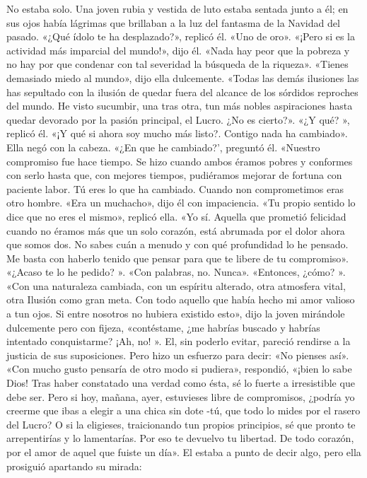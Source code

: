 \documentclass{novela}
\begin{document}
 No estaba solo. Una joven rubia y vestida de luto estaba sentada junto a él; en sus ojos había lágrimas que brillaban a la luz del fantasma de la Navidad del pasado.
 «¿Qué ídolo te ha desplazado?», replicó él.
 «Uno de oro».
 «¡Pero si es la actividad más imparcial del mundo!», dijo él. «Nada hay peor que la pobreza y no hay por que condenar con tal severidad la búsqueda de la riqueza».
 «Tienes demasiado miedo al mundo», dijo ella dulcemente. «Todas las demás ilusiones las has sepultado con la ilusión de quedar fuera del alcance de los sórdidos reproches del mundo. He visto sucumbir, una tras otra, tun más nobles aspiraciones hasta quedar devorado por la pasión principal, el Lucro. ¿No es cierto?».
 «¿Y qué? », replicó él. «¡Y qué si ahora soy mucho más listo?. Contigo nada ha cambiado».
 Ella negó con la cabeza.
 «¿En que he cambiado?', preguntó él.
 «Nuestro compromiso fue hace tiempo. Se hizo cuando ambos éramos pobres y conformes con serlo hasta que, con mejores tiempos, pudiéramos mejorar de fortuna con paciente labor. Tú eres lo que ha cambiado. Cuando non comprometimos eras otro hombre.
 «Era un muchacho», dijo él con impaciencia.
 «Tu propio sentido lo dice que no eres el mismo», replicó ella. «Yo sí. Aquella que prometió felicidad cuando no éramos más que un solo corazón, está abrumada por el dolor ahora que somos dos. No sabes cuán a menudo y con qué profundidad lo he pensado. Me basta con haberlo tenido que pensar para que te libere de tu compromiso».
 «¿Acaso te lo he pedido? ».
 «Con palabras, no. Nunca».
 «Entonces, ¿cómo? ».
 «Con una naturaleza cambiada, con un espíritu alterado, otra atmosfera vital, otra Ilusión como gran meta. Con todo aquello que había hecho mi amor valioso a tun ojos. Si entre nosotros no hubiera existido esto», dijo la joven mirándole dulcemente pero con fijeza, «contéstame, ¿me habrías buscado y habrías intentado conquistarme? ¡Ah, no! ».
 El, sin poderlo evitar, pareció rendirse a la justicia de sus suposiciones. Pero hizo un esfuerzo para decir: «No pienses así».
 «Con mucho gusto pensaría de otro modo si pudiera», respondió, «¡bien lo sabe Dios! Tras haber constatado una verdad como ésta, sé lo fuerte a irresistible que debe ser. Pero si hoy, mañana, ayer, estuvieses libre de compromisos, ¿podría yo creerme que ibas a elegir a una chica sin dote -tú, que todo lo mides por el rasero del Lucro? O si la eligieses, traicionando tun propios principios, sé que pronto te arrepentirías y lo lamentarías. Por eso te devuelvo tu libertad. De todo corazón, por el amor de aquel que fuiste un día».
 El estaba a punto de decir algo, pero ella prosiguió apartando su mirada:
\end{document}
